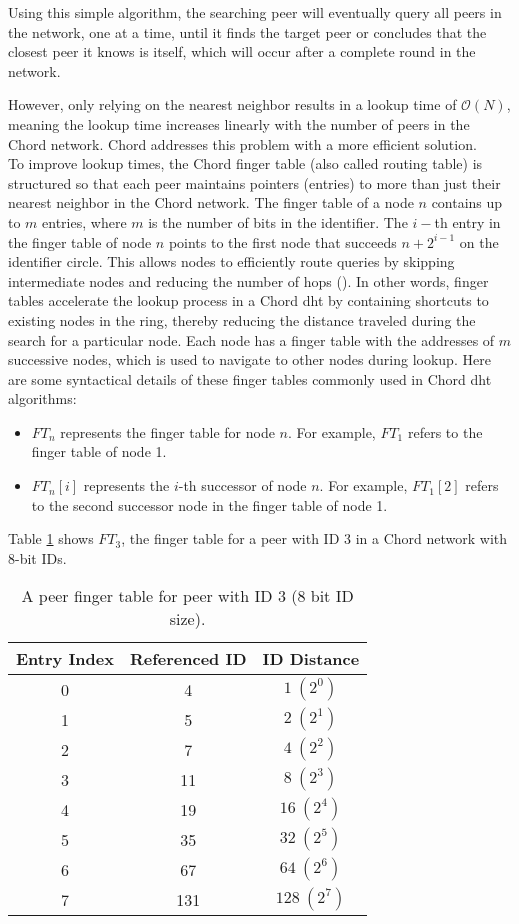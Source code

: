 Using this simple algorithm, the searching peer will eventually query all peers in the network, one at a time, until it finds the target peer or concludes that the closest peer it knows is itself, which will occur after a complete round in the network.

However, only relying on the nearest neighbor results in a lookup time of $\mathcal{O}(N)$, meaning the lookup time increases linearly with the number of peers in the Chord network.
Chord addresses this problem with a more efficient solution.
\\To improve lookup times, the Chord finger table (also called routing table) is structured so that each peer maintains pointers (entries) to more than just their nearest neighbor in the Chord network.
The finger table of a node \(n\) contains up to \(m\) entries, where \(m\) is the number of bits in the identifier.
The $i-$th entry in the finger table of node \(n\) points to the first node that succeeds \(n + 2^{i-1}\) on the identifier circle.
This allows nodes to efficiently route queries by skipping intermediate nodes and reducing the number of hops (\cite{stoica2001}).
In other words, finger tables accelerate the lookup process in a Chord \gls{dht} by containing shortcuts to existing nodes in the ring, thereby reducing the distance traveled during the search for a particular node.
Each node has a finger table with the addresses of $m$ successive nodes, which is used to navigate to other nodes during lookup.
Here are some syntactical details of these finger tables commonly used in Chord \gls{dht} algorithms:
\begin{itemize}
    \item $FT_n$ represents the finger table for node $n$.
    For example, $FT_1$ refers to the finger table of node 1.
	\item $FT_n[i]$ represents the $i$-th successor of node $n$.
    For example, $FT_1[2]$ refers to the second successor node in the finger table of node 1.
\end{itemize}
Table \ref{tab:peer-finger-table} shows $FT_3$, the finger table for a peer with ID 3 in a Chord network with 8-bit IDs.
\begin{table}[htbp]
    \centering
    \begin{tabular}{|c|c|c|}
        \hline
        \textbf{Entry Index} & \textbf{Referenced ID} & \textbf{ID Distance} \\ \hline
        0 & 4 & $1 \ (2^0)$ \\ \hline
        1 & 5 & $2 \ (2^1)$ \\ \hline
        2 & 7 & $4 \ (2^2)$ \\ \hline
        3 & 11 & $8 \ (2^3)$ \\ \hline
        4 & 19 & $16 \ (2^4)$ \\ \hline
        5 & 35 & $32 \ (2^5)$ \\ \hline
        6 & 67 & $64 \ (2^6)$ \\ \hline
        7 & 131 & $128 \ (2^7)$ \\ \hline
    \end{tabular}
    \caption{A peer finger table for peer with ID 3 (8 bit ID size).}
    \label{tab:peer-finger-table}
\end{table}

